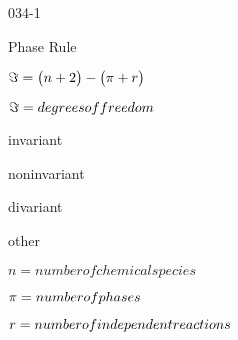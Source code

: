 \begin{mitframe}{034-1} %
    
\begin{listone}
    
    \item Phase Rule
    
    \begin{listtwo}
    
    	\item $\dof=\big(n+2\big)-\big(\pie+\pos\big)$
    
    	\begin{listthree}
		
        	\item $\dof=degrees of freedom$
            
            \begin{listfour}

				\item invariant
            
            	\item noninvariant
            
            	\item divariant
                
                \item other

			\end{listfour}

			\item $n= number of chemical species$
            
            \item $\pie=number of phases$
            
            \item $\pos=number of independent reactions$

		\end{listthree}     
    
    \end{listtwo}
    

\end{listone}
\end{mitframe}
